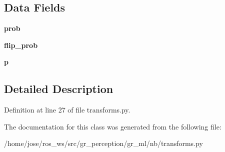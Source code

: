 \subsection*{Data Fields}
\begin{DoxyCompactItemize}
\item 
\mbox{\label{classtransforms_1_1RandomHorizontalFlip_ad5fff7c62428b4c9c4682a0c344c4839}} 
{\bfseries prob}
\item 
\mbox{\label{classtransforms_1_1RandomHorizontalFlip_a0edc2dab738196410020ef32544d9498}} 
{\bfseries flip\+\_\+prob}
\item 
\mbox{\label{classtransforms_1_1RandomHorizontalFlip_a6860576ecfc14e531bea41815f597f36}} 
{\bfseries p}
\end{DoxyCompactItemize}


\subsection{Detailed Description}


Definition at line 27 of file transforms.\+py.



The documentation for this class was generated from the following file\+:\begin{DoxyCompactItemize}
\item 
/home/jose/ros\+\_\+ws/src/gr\+\_\+perception/gr\+\_\+ml/nb/transforms.\+py\end{DoxyCompactItemize}
